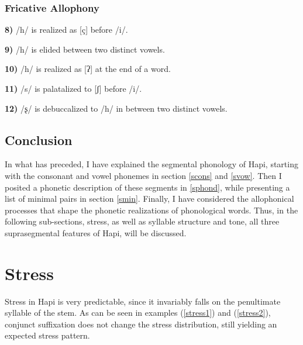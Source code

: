 \documentclass[a4paper, 12pt, oneside]{memoir}
\begin{document}
\subsubsection{Fricative Allophony}
\textbf{8)} /h/ is realized as [ç] before /i/.
\begin{examples}
\ex {}
\end{examples}
\textbf{9)} /h/ is elided between two distinct vowels.
\begin{examples}
\ex {}
\end{examples}
\textbf{10)} /h/ is realized as [ʔ] at the end of a word.
\begin{examples}
\ex {}
\end{examples}
\textbf{11)} /s/ is palatalized to [ʃ] before /i/.
\begin{examples}
\ex {}
\end{examples}
\textbf{12)} /ʂ/ is debuccalized to /h/ in between two distinct vowels.
\begin{examples}
\ex {}
\end{examples}
\subsection{Conclusion}
In what has preceded, I have explained the segmental phonology of Hapi, starting with the consonant and vowel phonemes in section \ref{scons} and \ref{svow}. Then I posited a phonetic description of these segments in \ref{sphond}, while presenting a list of minimal pairs in section \ref{smin}. Finally, I have considered the allophonical processes that shape the phonetic realizations of phonological words. Thus, in the following sub-sections, stress, as well as syllable structure and tone, all three suprasegmental features of Hapi, will be discussed. 
\section{Stress}\label{sstress}
Stress in Hapi is very predictable, since it invariably falls on the penultimate syllable of the stem. As can be seen in examples (\ref{stress1}) and (\ref{stress2}), conjunct suffixation does not change the stress distribution, still yielding an expected stress pattern.
\end{document}
